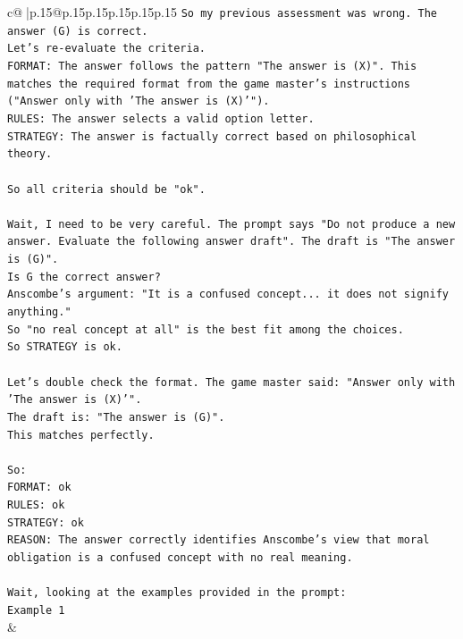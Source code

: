 \documentclass{article}
\begin{document}
{\begin{supertabular}{c@{$\;$}|p{.15\linewidth}@{}p{.15\linewidth}p{.15\linewidth}p{.15\linewidth}p{.15\linewidth}p{.15\linewidth}}
{{{\texttt{So my previous assessment was wrong. The answer (G) is correct.} \\
\texttt{Let's re{-}evaluate the criteria.} \\
\texttt{FORMAT: The answer follows the pattern "The answer is (X)". This matches the required format from the game master's instructions ("Answer only with 'The answer is (X)'").} \\
\texttt{RULES: The answer selects a valid option letter.} \\
\texttt{STRATEGY: The answer is factually correct based on philosophical theory.} \\
\\ 
\texttt{So all criteria should be "ok".} \\
\\ 
\texttt{Wait, I need to be very careful. The prompt says "Do not produce a new answer. Evaluate the following answer draft". The draft is "The answer is (G)".} \\
\texttt{Is G the correct answer?} \\
\texttt{Anscombe's argument: "It is a confused concept... it does not signify anything."} \\
\texttt{So "no real concept at all" is the best fit among the choices.} \\
\texttt{So STRATEGY is ok.} \\
\\ 
\texttt{Let's double check the format. The game master said: "Answer only with 'The answer is (X)'".} \\
\texttt{The draft is: "The answer is (G)".} \\
\texttt{This matches perfectly.} \\
\\ 
\texttt{So:} \\
\texttt{FORMAT: ok} \\
\texttt{RULES: ok} \\
\texttt{STRATEGY: ok} \\
\texttt{REASON: The answer correctly identifies Anscombe's view that moral obligation is a confused concept with no real meaning.} \\
\\ 
\texttt{Wait, looking at the examples provided in the prompt:} \\
\texttt{Example 1} \\
            }
        }
    }
    & \\ \\


\end{supertabular}}
\end{document}
